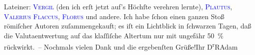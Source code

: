                     Lateiner: \textcolor{blue}{\textsc{Vergil}}{}\ledrightnote{\textcolor{blue}{Otto Fürth}} (den ich erſt jetzt auf's Höchſte
                    verehren lernte), \textcolor{blue}{\textsc{Plautus}}{}\ledrightnote{\textcolor{blue}{Titus Maccius Plautus}}, \textcolor{blue}{\textsc{Valerius Flaccus}}{}\ledrightnote{\textcolor{blue}{Gaius Valerius Flaccus}}, \textcolor{blue}{\textsc{Florus}}{}\ledrightnote{\textcolor{blue}{Florus}} und andere. Ich habe ſchon einen
                    ganzen Stoß römiſcher Autoren zuſammengekauft; es iſt ein Lichtblick in
                    ſchwarzen Tagen, daß die Valutaentwertung auf das klaſſiſche Altertum nur mit
                    ungefähr 50 {\%} rückwirkt. –\pend
           \pstart
           Nochmals vielen Dank und die ergebenſten Grüße!\hspace*{3.5em}Ihr\pend
           \pstart \spacefill\mbox{D\textsuperscript{r}RAdam}\pend{}\endnumbering{}  
      
